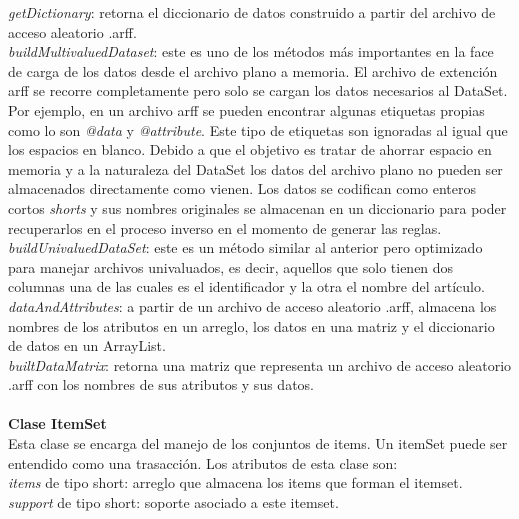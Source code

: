  \textit{getDictionary}: retorna el diccionario de datos construido a partir del archivo de acceso
aleatorio .arff. \\

 \textit{buildMultivaluedDataset}: este es uno de los m\'etodos m\'as importantes en la face de carga de
los datos desde el archivo plano a memoria. El archivo de extenci\'on arff se recorre completamente pero solo se
cargan los datos necesarios al DataSet. Por ejemplo, en un archivo arff se pueden encontrar algunas etiquetas
propias como lo son \textit{@data }y \textit{@attribute}. Este tipo de etiquetas son ignoradas al igual que los
espacios en blanco. Debido a que el objetivo es tratar de ahorrar espacio en memoria y a la naturaleza del DataSet
los datos del archivo plano no pueden ser almacenados directamente como vienen. Los datos se codifican como
enteros cortos \textit{shorts} y sus nombres originales se almacenan en un diccionario para poder recuperarlos en
el proceso inverso en el momento de generar las reglas.\\

 \textit{buildUnivaluedDataSet}: este es un m\'etodo similar al anterior pero optimizado para manejar
archivos univaluados, es decir, aquellos que solo tienen dos columnas una de las cuales es el identificador y la
otra el nombre del art\'iculo.\\

 \textit{dataAndAttributes}: a partir de un archivo de acceso aleatorio .arff, almacena los nombres de
los atributos en un arreglo, los datos en una matriz y el diccionario de datos en un ArrayList.\\

 \textit{builtDataMatrix}: retorna una matriz que representa un archivo de acceso aleatorio .arff con los
nombres de sus atributos y sus datos.\\ \\

 \textbf{Clase ItemSet}\\

 Esta clase se encarga del manejo de los conjuntos de items. Un itemSet puede ser entendido como una
trasacci\'on. Los atributos de esta clase son:\\

 \textit{items} de tipo short: arreglo que almacena los items que forman el itemset.\\

 \textit{support} de tipo short: soporte asociado a este itemset.\\

